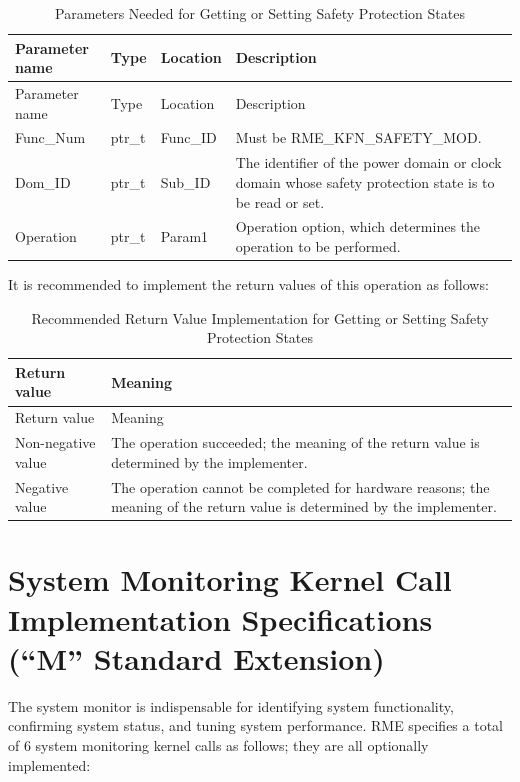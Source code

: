 \begin{xltabular}{\textwidth}{@{}>{\hsize\raggedright\arraybackslash}X>{\hsize\raggedright\arraybackslash}X>{\hsize\raggedright\arraybackslash}X>{\hsize\raggedright\arraybackslash}X@{}}
\caption{Parameters Needed for Getting or Setting Safety Protection States}\label{tab:8-55-get-or-set-safety-protection-state-parameters}\\
\toprule
Parameter name & Type & Location & Description\tabularnewline
\endfirsthead
\toprule
Parameter name & Type & Location & Description\tabularnewline
\midrule
\endhead
\bottomrule
\endlastfoot
Func\_Num & ptr\_t & Func\_ID & Must be RME\_KFN\_SAFETY\_MOD.\tabularnewline
Dom\_ID & ptr\_t & Sub\_ID &
The identifier of the power domain or clock domain whose safety protection state is to be read or set.\tabularnewline
Operation & ptr\_t & Param1 &
Operation option, which determines the operation to be performed.\tabularnewline
\end{xltabular}
\nopagebreak[4]

It is recommended to implement the return values of this operation as follows:

\begin{xltabular}{\textwidth}{@{}>{\hsize\raggedright\arraybackslash}X>{\hsize\raggedright\arraybackslash}X@{}}
\caption{Recommended Return Value Implementation for Getting or Setting Safety Protection States}\label{tab:8-56-get-or-set-safety-protection-state-suggested-return-values}\\
\toprule
Return value & Meaning\tabularnewline
\endfirsthead
\toprule
Return value & Meaning\tabularnewline
\midrule
\endhead
\bottomrule
\endlastfoot
    Non-negative value & The operation succeeded; the meaning of the return value is determined by the implementer.\tabularnewline
    Negative value & The operation cannot be completed for hardware reasons; the meaning of the return value is determined by the implementer.\tabularnewline
\end{xltabular}
\nopagebreak[4]

\section{System Monitoring Kernel Call Implementation Specifications (``M'' Standard Extension)}\label{sec:8-system-monitor-kernel-calls}
\nopagebreak[4]

The system monitor is indispensable for identifying system functionality, confirming system status, and tuning system performance. RME specifies a total of 6 system monitoring kernel calls as follows; they are all optionally implemented:

